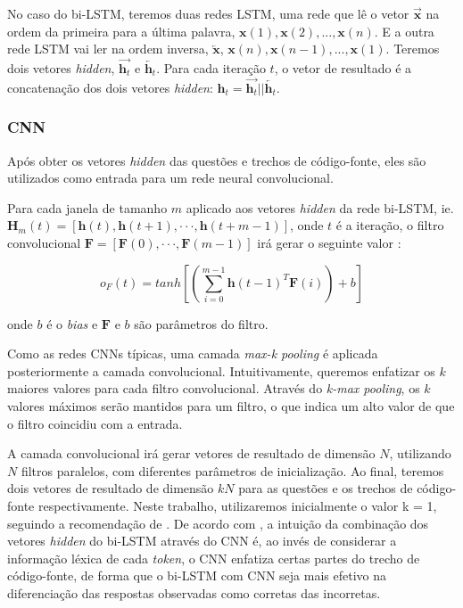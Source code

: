 No caso do bi-LSTM, teremos duas redes LSTM, uma rede que lê o vetor $\overrightarrow{\bm{x}}$ na ordem da primeira para a última palavra, $\bm{x}(1), \bm{x}(2), . . ., \bm{x}(n)$. E a outra rede LSTM vai ler na ordem inversa, $\overleftarrow{\bm{x}}$, $\bm{x}(n), \bm{x}(n - 1), . . ., \bm{x}(1)$. Teremos dois vetores \textit{hidden}, $\overrightarrow{\bm{h}_{t}}$ e $\overleftarrow{\bm{h}_{t}}$. Para cada iteração $t$, o vetor de resultado é a concatenação dos dois vetores \textit{hidden}: $\bm{h}_{t} = \overrightarrow{\bm{h}_{t}} || \overleftarrow{\bm{h}_{t}}$.

\subsubsection{CNN}
\label{sec:cnn}

Após obter os vetores \textit{hidden} das questões e trechos de código-fonte, eles são utilizados como entrada para um rede neural convolucional. 

Para cada janela de tamanho $m$ aplicado aos vetores \textit{hidden} da rede bi-LSTM, ie. 
$\bm{H}_{m}(t) = [\bm{h}(t), \bm{h}(t + 1), · · · , \bm{h}(t + m − 1)]$, onde $t$ é a iteração, o filtro convolucional $\bm{F}  = [\bm{F}(0),· · ·, \bm{F}(m − 1)]$ irá gerar o seguinte valor \citep{tan-lstm-qa}:

\begin{equation}
    o_{F}(t) = tanh \left[\left(\sum_{i=0}^{m - 1} \bm{h}(t-1)^{T}\bm{F}(i)\right) + b\right]
\end{equation}

onde $b$ é o \textit{bias} e $\bm{F}$ e $b$ são parâmetros do filtro.

Como as redes CNNs típicas, uma camada \textit{max-k pooling} é aplicada posteriormente a camada convolucional. Intuitivamente, queremos enfatizar os $k$ maiores valores para cada filtro convolucional. Através do \textit{k-max pooling}, os $k$ valores máximos serão mantidos para um filtro, o que indica um alto valor de que o filtro coincidiu com a entrada. 

A camada convolucional irá gerar vetores de resultado de dimensão $N$, utilizando $N$ filtros paralelos, com diferentes parâmetros de inicialização. Ao final, teremos dois vetores de resultado de dimensão $kN$ para as questões e os trechos de código-fonte respectivamente. Neste trabalho, utilizaremos inicialmente o valor k = 1, seguindo a recomendação de \cite{tan-lstm-qa}. De acordo com \cite{tan-lstm-qa}, a intuição da combinação dos vetores \textit{hidden} do bi-LSTM através do CNN é, ao invés de considerar a informação léxica de cada \textit{token}, o CNN enfatiza certas partes do trecho de código-fonte, de forma que o bi-LSTM com CNN seja mais efetivo na diferenciação das respostas observadas como corretas das incorretas.


